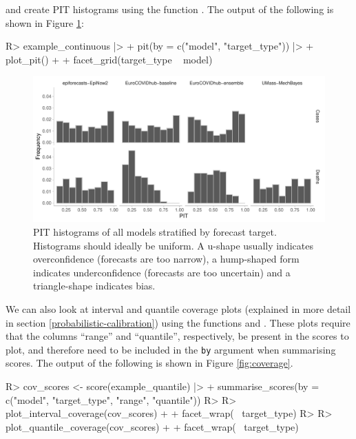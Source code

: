\documentclass[
]{jss}
\begin{document}
and create PIT histograms using the function . The
output of the following is shown in Figure \ref{fig:pit-plots}:

\begin{CodeChunk}
\begin{CodeInput}
R> example_continuous |>
+   pit(by = c("model", "target_type")) |>
+   plot_pit() + 
+   facet_grid(target_type ~ model)
\end{CodeInput}
\begin{figure}[!h]

{\centering \includegraphics[width=1\linewidth]{manuscript_files/figure-latex/pit-plots-1} 

}

\caption[PIT histograms of all models stratified by forecast target]{PIT histograms of all models stratified by forecast target. Histograms should ideally be uniform. A u-shape usually indicates overconfidence (forecasts are too narrow), a hump-shaped form indicates underconfidence (forecasts are too uncertain) and a triangle-shape indicates bias.}\label{fig:pit-plots}
\end{figure}
\end{CodeChunk}

We can also look at interval and quantile coverage plots (explained in
more detail in section \ref{probabilistic-calibration}) using the
functions  and
. These plots require that the columns
``range'' and ``quantile'', respectively, be present in the scores to
plot, and therefore need to be included in the \texttt{by} argument when
summarising scores. The output of the following is shown in Figure
\ref{fig:coverage}.

\begin{CodeChunk}
\begin{CodeInput}
R> cov_scores <- score(example_quantile) |>
+   summarise_scores(by = c("model", "target_type", "range", "quantile"))
R> 
R> plot_interval_coverage(cov_scores) + 
+   facet_wrap(~ target_type)
R> 
R> plot_quantile_coverage(cov_scores) + 
+   facet_wrap(~ target_type)
\end{CodeInput}
\end{CodeChunk}
\end{document}
